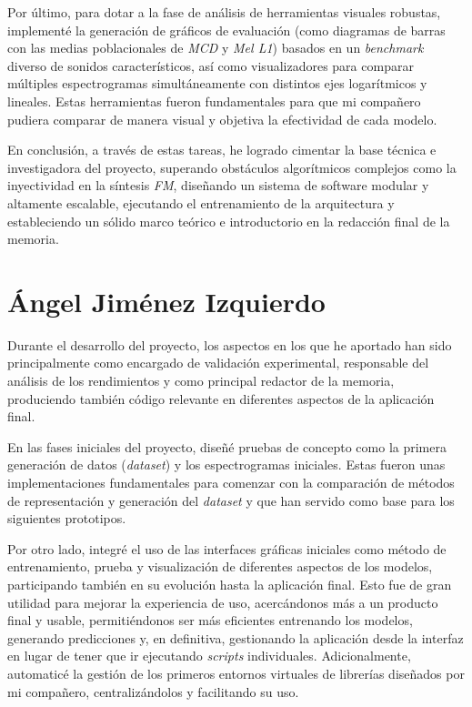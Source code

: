 Por último, para dotar a la fase de análisis de herramientas visuales robustas, implementé la generación de gráficos de evaluación (como diagramas de barras con las medias poblacionales de \textit{MCD} y \textit{Mel L1}) basados en un \textit{benchmark} diverso de sonidos característicos, así como visualizadores para comparar múltiples espectrogramas simultáneamente con distintos ejes logarítmicos y lineales. Estas herramientas fueron fundamentales para que mi compañero pudiera comparar de manera visual y objetiva la efectividad de cada modelo.

En conclusión, a través de estas tareas, he logrado cimentar la base técnica e investigadora del proyecto, superando obstáculos algorítmicos complejos como la inyectividad en la síntesis \textit{FM}, diseñando un sistema de software modular y altamente escalable, ejecutando el entrenamiento de la arquitectura y estableciendo un sólido marco teórico e introductorio en la redacción final de la memoria.

\section*{Ángel Jiménez Izquierdo}

Durante el desarrollo del proyecto, los aspectos en los que he aportado han sido principalmente como encargado de validación experimental, responsable del análisis de los rendimientos y como principal redactor de la memoria, produciendo también código relevante en diferentes aspectos de la aplicación final. 

En las fases iniciales del proyecto, diseñé pruebas de concepto como la primera generación de datos (\textit{dataset}) y los espectrogramas iniciales. Estas fueron unas implementaciones fundamentales para comenzar con la comparación de métodos de representación y generación del \textit{dataset} y que han servido como base para los siguientes prototipos. 

Por otro lado, integré el uso de las interfaces gráficas iniciales como método de entrenamiento, prueba y visualización de diferentes aspectos de los modelos, participando también en su evolución hasta la aplicación final. Esto fue de gran utilidad para mejorar la experiencia de uso, acercándonos más a un producto final y usable, permitiéndonos ser más eficientes entrenando los modelos, generando predicciones y, en definitiva, gestionando la aplicación desde la interfaz en lugar de tener que ir ejecutando \textit{scripts} individuales. Adicionalmente, automaticé la gestión de los primeros entornos virtuales de librerías diseñados por mi compañero, centralizándolos y facilitando su uso.

